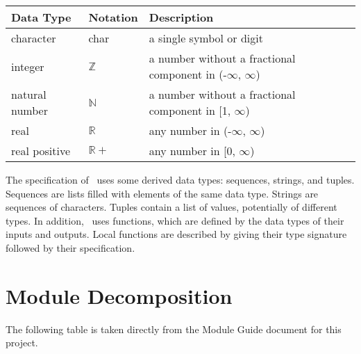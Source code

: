 \documentclass[12pt, titlepage]{article}
\begin{document}
\begin{center}
	\renewcommand{\arraystretch}{1.2}
	\noindent
	\begin{tabular}{l l p{7.5cm}}
		\toprule
		\textbf{Data Type} & \textbf{Notation} & \textbf{Description}                                             \\
		\midrule
		character          & char              & a single symbol or digit                                         \\
		integer            & $\mathbb{Z}$      & a number without a fractional component in (-$\infty$, $\infty$) \\
		natural number     & $\mathbb{N}$      & a number without a fractional component in [1, $\infty$)         \\
		real               & $\mathbb{R}$      & any number in (-$\infty$, $\infty$)                              \\
		real positive      & $\mathbb{R}+$     & any number in [0, $\infty$)                                      \\
		\bottomrule
	\end{tabular}
\end{center}

\noindent
The specification of \progname \ uses some derived data types: sequences, strings, and
tuples. Sequences are lists filled with elements of the same data type. Strings
are sequences of characters. Tuples contain a list of values, potentially of
different types. In addition, \progname \ uses functions, which
are defined by the data types of their inputs and outputs. Local functions are
described by giving their type signature followed by their specification.

\section{Module Decomposition}

The following table is taken directly from the Module Guide document for this project.
\end{document}

